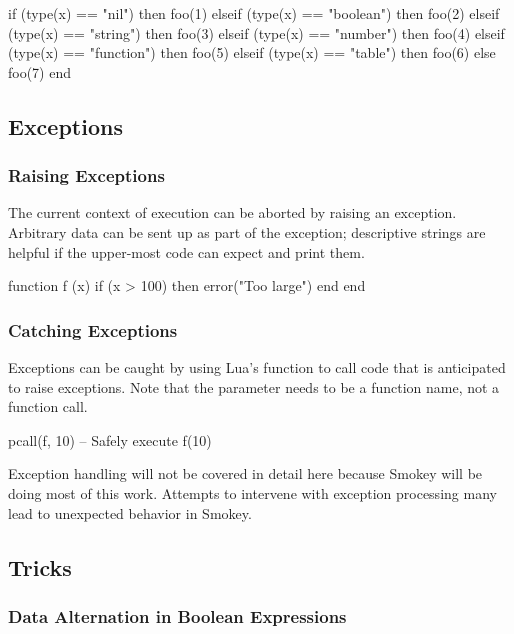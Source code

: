 \begin{LuaCode}
if (type(x) == "nil") then
	foo(1)
elseif (type(x) == "boolean") then
	foo(2)
elseif (type(x) == "string") then
	foo(3)
elseif (type(x) == "number") then
	foo(4)
elseif (type(x) == "function") then
	foo(5)
elseif (type(x) == "table") then
	foo(6)
else
	foo(7)
end
\end{LuaCode}

\subsection{Exceptions}

\subsubsection{Raising Exceptions}

The current context of execution can be aborted by raising an exception.
Arbitrary data can be sent up as part of the exception; descriptive strings are
helpful if the upper-most code can expect and print them.

\begin{LuaCode}
function f (x)
	if (x > 100) then
		error("Too large")
	end
end
\end{LuaCode}

\subsubsection{Catching Exceptions}

Exceptions can be caught by using Lua's  function to call code that
is anticipated to raise exceptions.  Note that the parameter needs to be a
function name, not a function call.

\begin{LuaCode}
pcall(f, 10) -- Safely execute f(10)
\end{LuaCode}

Exception handling will not be covered in detail here because Smokey will be
doing most of this work.  Attempts to intervene with exception processing many
lead to unexpected behavior in Smokey.

\subsection{Tricks}

\subsubsection{Data Alternation in Boolean Expressions}

